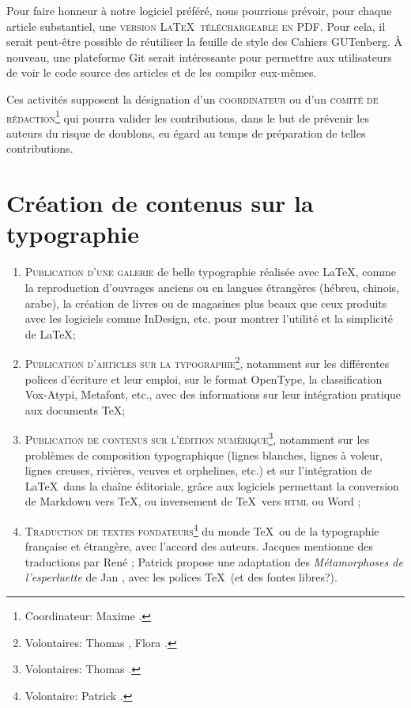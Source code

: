 \documentclass{tufte-handout}
\newcommand{\ratio}[3][]{\marginpar{\footnotesize{\textcolor{teal}{Temps requis: #2 / Utilité: #3}\par\noindent \textcolor{teal}{#1}}}}
\begin{document}
Pour faire honneur à notre logiciel préféré\ratio[Possibilité
d'automatisation]{+}{+++}, nous pourrions prévoir, pour chaque article
substantiel, une \textsc{version \LaTeX\ téléchargeable en PDF}. Pour cela, il
serait peut-être possible de réutiliser la feuille de style des Cahiers
GUTenberg. À nouveau, une plateforme Git serait intéressante pour permettre aux
utilisateurs de voir le code source des articles et de les compiler eux-mêmes.

Ces activités supposent la désignation d'un
\textsc{coordinateur}\ratio[Potentiellement chronophage]{++}{++} ou d'un
\textsc{comité de rédaction}\footnote{Coordinateur: Maxime .} qui
pourra valider les contributions, dans le but de prévenir les auteurs du risque
de doublons, eu égard au temps de préparation de telles contributions.


\section{Création de contenus sur la typographie}

\begin{enumerate}
\item\textsc{Publication d'une galerie}\ratio[Les documents existent]{+}{+++} de
  belle typographie réalisée avec \LaTeX, comme la reproduction d'ouvrages
  anciens ou en langues étrangères (hébreu, chinois, arabe), la création de
  livres ou de magasines plus beaux que ceux produits avec les logiciels comme
  InDesign, etc. pour montrer l'utilité et la simplicité de \LaTeX ;
\item\textsc{Publication d'articles sur la typographie}\ratio[Individuellement
  assez peu chronophage, d'autant que certaines ressources
  existent]{++}{++}\footnote{Volontaires: Thomas , Flora
    .}, notamment sur les différentes polices d'écriture et leur
  emploi, sur le format OpenType, la classification Vox-Atypi, Metafont, etc.,
  avec des informations sur leur intégration pratique aux documents \TeX ;
\item\textsc{Publication de contenus sur l'édition
    numérique}\ratio[Individuellement assez peu chronophage, d'autant que
  certaines ressources existent]{++}{++}\footnote{Volontaires: Thomas
    .}, notamment sur les problèmes de composition typographique
  (lignes blanches, lignes à voleur, lignes creuses, rivières, veuves et
  orphelines, etc.) et sur l'intégration de \LaTeX\ dans la chaîne éditoriale,
  grâce aux logiciels permettant la conversion de Markdown vers \TeX, ou
  inversement de \TeX\ vers \textsc{html} ou Word ;
\item\textsc{Traduction de textes
    fondateurs}\ratio[Chronophage]{+++}{+}\footnote{Volontaire: Patrick
    .} du monde \TeX\ ou de la typographie française et étrangère,
  avec l'accord des auteurs. Jacques  mentionne des traductions par
  René ; Patrick  propose une adaptation des
  \emph{Métamorphoses de l'esperluette} de Jan , avec les
  polices \TeX~(et des fontes libres?).
\end{enumerate}
\end{document}
